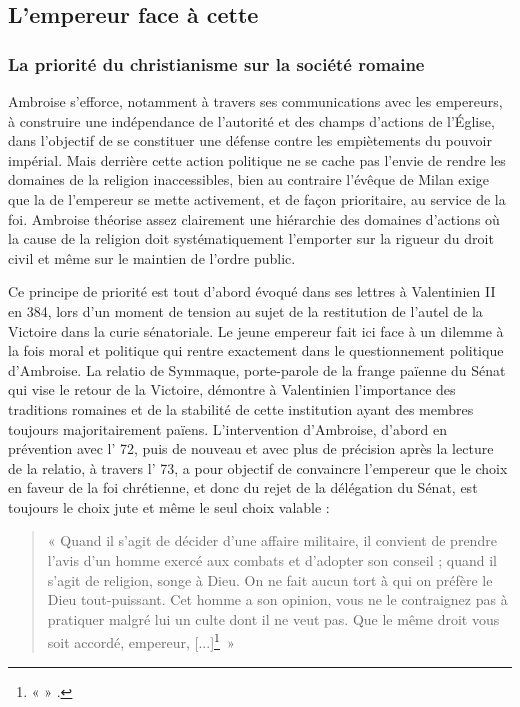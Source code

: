 \bigskip

\subsection{L'empereur face à cette }

\subsubsection{La priorité du christianisme sur la société romaine}

Ambroise s’efforce, notamment à travers ses communications avec les empereurs, à construire une indépendance de l’autorité et des champs d’actions de l’Église, dans l’objectif de se constituer une défense contre les empiètements du pouvoir impérial. Mais derrière cette action politique ne se cache pas l’envie de rendre les domaines de la religion inaccessibles, bien au contraire l’évêque de Milan exige que la  de l’empereur se mette activement, et de façon prioritaire, au service de la foi. Ambroise théorise assez clairement une hiérarchie des domaines d’actions où la cause de la religion doit systématiquement l’emporter sur la rigueur du droit civil et même sur le maintien de l'ordre public.

\bigskip

Ce principe de priorité est tout d’abord évoqué dans ses lettres à Valentinien II en 384, lors d’un moment de tension au sujet de la restitution de l’autel de la Victoire dans la curie sénatoriale. Le jeune empereur fait ici face à un dilemme à la fois moral et politique qui rentre exactement dans le questionnement politique d’Ambroise. La relatio de Symmaque, porte-parole de la frange païenne du Sénat qui vise le retour de la Victoire, démontre à Valentinien l’importance des traditions romaines et de la stabilité de cette institution ayant des membres toujours majoritairement païens. L’intervention d’Ambroise, d’abord en prévention avec l’ 72, puis de nouveau et avec plus de précision après la lecture de la relatio, à travers l’ 73, a pour objectif de convaincre l’empereur que le choix en faveur de la foi chrétienne, et donc du rejet de la délégation du Sénat, est toujours le choix jute et même le seul choix valable :

\bigskip

\begin{quote}
    « Quand il s’agit de décider d’une affaire militaire, il convient de prendre l’avis d’un homme exercé aux combats et d’adopter son conseil ; quand il s’agit de religion, songe à Dieu. On ne fait aucun tort à qui on préfère le Dieu tout-puissant. Cet homme a son opinion, vous ne le contraignez pas à pratiquer malgré lui un culte dont il ne veut pas. Que le même droit vous soit accordé, empereur, [...]\footnote{«  » \cite[,7]{ambroise_lettres}.}~»
\end{quote}


